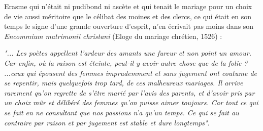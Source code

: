 Erasme qui n'était ni pudibond ni ascète et qui tenait le mariage pour un choix de vie aussi méritoire que le célibat des moines et des clercs, ce qui était en son temps le signe d'une grande ouverture d'esprit, n'en écrivait pas moins dans son \emph{Encommium matrimonii christani} (Eloge du mariage chrétien, 1526) : 

\begin{displayquote}
\emph{"... Les poètes appellent l'ardeur des amants une fureur et non point un amour. Car enfin, où la raison est éteinte, peut-il y avoir autre chose que de la folie ? ...ceux qui épousent des femmes imprudemment et sans jugement ont coutume de se repentir, mais quelquefois trop tard, de ces malheureux mariages. Il arrive rarement qu'on regrette de s'être marié par l'avis des parents, et d'avoir pris par un choix mûr et délibéré des femmes qu'on puisse aimer toujours. Car tout ce qui se fait en ne consultant que nos passions n'a qu'un temps. Ce qui se fait au contraire par raison et par jugement est stable et dure longtemps"}.  
\end{displayquote}

